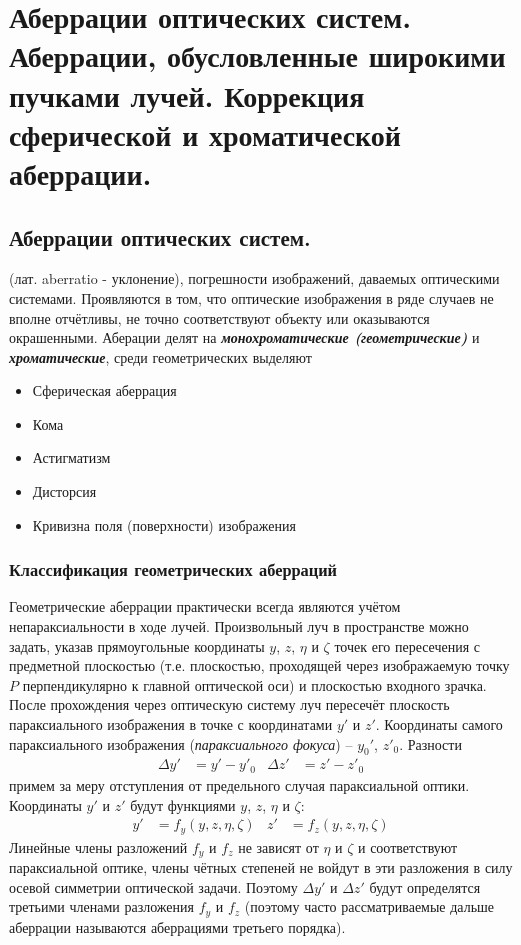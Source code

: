 \section{Аберрации оптических систем. Аберрации, обусловленные широкими пучками лучей. Коррекция сферической и хроматической аберрации.}
\subsection{Аберрации оптических систем.}
	 (лат. aberratio - уклонение),
	погрешности изображений, даваемых оптическими системами.
	Проявляются в том, что оптические изображения в ряде случаев не
	вполне отчётливы, не точно соответствуют объекту или оказываются
	окрашенными.
Аберации делят на \textbf{\textit{монохроматические (геометрические)}} и \textbf{\textit{хроматические}}, среди геометрических выделяют
\begin{itemize}
	\item Сферическая аберрация
	\item Кома
	\item Астигматизм
	\item Дисторсия 
	\item Кривизна поля (поверхности) изображения
\end{itemize}
\subsubsection{Классификация геометрических аберраций}
Геометрические аберрации практически всегда являются учётом непараксиальности в ходе лучей. Произвольный луч в пространстве можно задать, указав прямоугольные координаты $y$, $z$, $\eta$ и $\zeta$ точек его пересечения с  предметной плоскостью (т.е. плоскостью, проходящей через изображаемую точку $P$ перпендикулярно к главной оптической оси) и плоскостью входного зрачка. После прохождения через оптическую систему луч пересечёт плоскость параксиального изображения в точке с координатами $y'$ и $z'$. Координаты самого параксиального изображения (\textit{параксиального фокуса}) -- $y_{0}'$, $z'_{0}$. Разности
\begin{align*}
\Delta y' &= y' - y'_{0} & \Delta z' &= z'- z'_{0}
\end{align*} 
примем за меру отступления от предельного случая параксиальной оптики.
Координаты $y'$  и  $z'$ будут функциями $y$, $z$, $\eta$ и $\zeta$:
\begin{align*}
y' &= f_{y}(y,z,\eta,\zeta) & z' &= f_{z}(y,z,\eta,\zeta)
\end{align*}
Линейные члены разложений $f_{y}$ и $f_{z}$ не зависят от $\eta$ и $\zeta$ и соответствуют параксиальной оптике, члены чётных степеней не войдут в эти разложения в силу осевой симметрии оптической задачи. Поэтому $\Delta y'$ и $\Delta z'$ будут определятся третьими членами разложения $f_{y}$ и $f_{z}$ (поэтому часто рассматриваемые дальше аберрации называются аберрациями третьего порядка).
 
